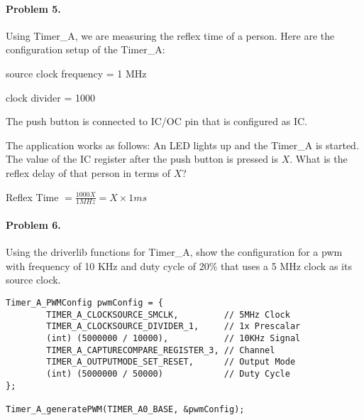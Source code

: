 \documentclass[12pt,letterpaper,titlepage]{article}
\begin{document}
\begin{raggedright}
\clearpage
\paragraph{Problem 5. }
Using Timer\_A, we are measuring the reflex time of a person. Here are the configuration setup of the Timer\_A:

source clock frequency = 1 MHz

clock divider = 1000

The push button is connected to IC/OC pin that is configured as IC.

The application works as follows: An LED lights up and the Timer\_A is started. The value of the IC register after the push button is pressed is $X$. What is the reflex delay of that person in terms of $X$?

Reflex Time $= \frac{1000X}{1MHz} = X \times 1ms$

\paragraph{Problem 6. }
Using the driverlib functions for Timer\_A, show the configuration for a pwm with frequency of 10 KHz and duty cycle of 20\% that uses a 5 MHz clock as its source clock.

\begin{lstlisting}
Timer_A_PWMConfig pwmConfig = { 
        TIMER_A_CLOCKSOURCE_SMCLK,         // 5MHz Clock
        TIMER_A_CLOCKSOURCE_DIVIDER_1,     // 1x Prescalar
        (int) (5000000 / 10000),           // 10KHz Signal
        TIMER_A_CAPTURECOMPARE_REGISTER_3, // Channel
        TIMER_A_OUTPUTMODE_SET_RESET,      // Output Mode
        (int) (5000000 / 50000)            // Duty Cycle           
}; 

Timer_A_generatePWM(TIMER_A0_BASE, &pwmConfig); 
\end{lstlisting}
\end{raggedright}
\end{document}
